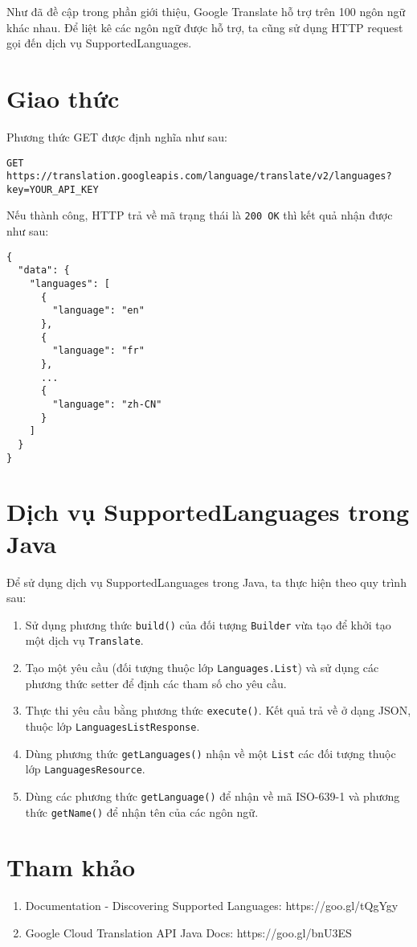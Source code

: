 \documentclass[../thesis.tex]{subfiles}
\begin{document}
Như đã đề cập trong phần giới thiệu, Google Translate hỗ trợ trên 100 ngôn ngữ khác nhau. Để liệt kê các ngôn ngữ được hỗ trợ, ta cũng sử dụng HTTP request gọi đến dịch vụ SupportedLanguages.

\section{Giao thức}

Phương thức GET được định nghĩa như sau:

\begin{lstlisting}[numbers=none, frame=single,xleftmargin=0.15cm,xrightmargin=0.15cm]
GET https://translation.googleapis.com/language/translate/v2/languages?key=YOUR_API_KEY
\end{lstlisting}

Nếu thành công, HTTP trả về mã trạng thái là \lstinline{200 OK} thì kết quả nhận được như sau:

\begin{lstlisting}[numbers=none, frame=single,xleftmargin=0.15cm,xrightmargin=0.15cm]
{
  "data": {
    "languages": [
      {
        "language": "en"
      },
      {
        "language": "fr"
      },
      ...
      {
        "language": "zh-CN"
      }
    ]
  }
}
\end{lstlisting}

\section{Dịch vụ SupportedLanguages trong Java}
Để sử dụng dịch vụ SupportedLanguages trong Java, ta thực hiện theo quy trình sau:
\begin{enumerate}
  \item Sử dụng phương thức \lstinline{build()} của đối tượng \lstinline{Builder} vừa tạo để khởi tạo một dịch vụ \lstinline{Translate}.
  \item Tạo một yêu cầu (đối tượng thuộc lớp \lstinline{Languages.List}) và sử dụng các phương thức setter để định các tham số cho yêu cầu.
  \item Thực thi yêu cầu bằng phương thức \lstinline{execute()}. Kết quả trả về ở dạng JSON, thuộc lớp \lstinline{LanguagesListResponse}.
  \item Dùng phương thức \lstinline{getLanguages()} nhận về một \lstinline{List} các đối tượng thuộc lớp \lstinline{LanguagesResource}.
  \item Dùng các phương thức \lstinline{getLanguage()} để nhận về mã ISO-639-1 và phương thức \lstinline{getName()} để nhận tên của các ngôn ngữ.
\end{enumerate}

\section*{Tham khảo}

\begin{enumerate}
  \item Documentation - Discovering Supported Languages: https://goo.gl/tQgYgy
  \item Google Cloud Translation API Java Docs: https://goo.gl/bnU3ES
\end{enumerate}
\end{document}
